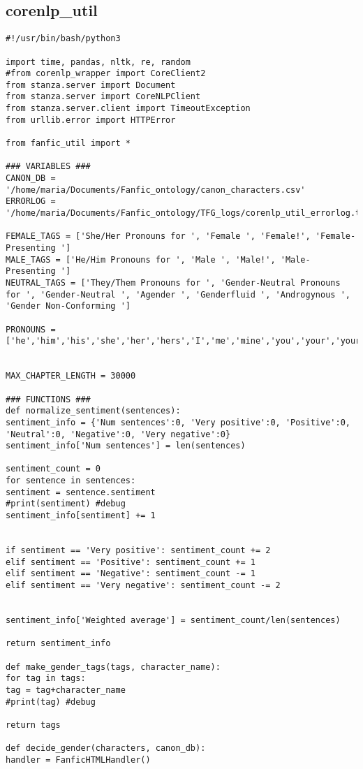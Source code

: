 \documentclass{pre-tfg}
\begin{document}
\subsection{corenlp\_util}
\begin{lstlisting}[style=consola]
#!/usr/bin/bash/python3

import time, pandas, nltk, re, random
#from corenlp_wrapper import CoreClient2
from stanza.server import Document
from stanza.server import CoreNLPClient
from stanza.server.client import TimeoutException
from urllib.error import HTTPError

from fanfic_util import *

### VARIABLES ###
CANON_DB = '/home/maria/Documents/Fanfic_ontology/canon_characters.csv'
ERRORLOG = '/home/maria/Documents/Fanfic_ontology/TFG_logs/corenlp_util_errorlog.txt'

FEMALE_TAGS = ['She/Her Pronouns for ', 'Female ', 'Female!', 'Female-Presenting ']
MALE_TAGS = ['He/Him Pronouns for ', 'Male ', 'Male!', 'Male-Presenting ']
NEUTRAL_TAGS = ['They/Them Pronouns for ', 'Gender-Neutral Pronouns for ', 'Gender-Neutral ', 'Agender ', 'Genderfluid ', 'Androgynous ', 'Gender Non-Conforming ']

PRONOUNS = ['he','him','his','she','her','hers','I','me','mine','you','your','yours','we','our','ours','they','them','theirs','it','its']


MAX_CHAPTER_LENGTH = 30000

### FUNCTIONS ###
def normalize_sentiment(sentences):
sentiment_info = {'Num sentences':0, 'Very positive':0, 'Positive':0, 'Neutral':0, 'Negative':0, 'Very negative':0}
sentiment_info['Num sentences'] = len(sentences)

sentiment_count = 0
for sentence in sentences:
sentiment = sentence.sentiment
#print(sentiment) #debug
sentiment_info[sentiment] += 1


if sentiment == 'Very positive': sentiment_count += 2
elif sentiment == 'Positive': sentiment_count += 1
elif sentiment == 'Negative': sentiment_count -= 1
elif sentiment == 'Very negative': sentiment_count -= 2


sentiment_info['Weighted average'] = sentiment_count/len(sentences)

return sentiment_info

def make_gender_tags(tags, character_name):
for tag in tags:
tag = tag+character_name
#print(tag) #debug

return tags

def decide_gender(characters, canon_db):
handler = FanficHTMLHandler()


\end{lstlisting}
\end{document}
